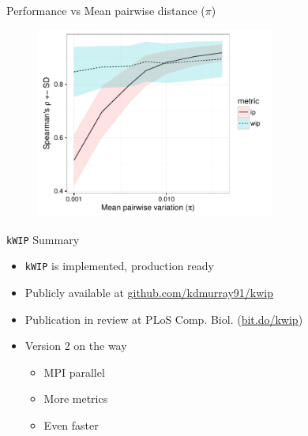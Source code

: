 \documentclass[t]{beamer}
\begin{document}
\begin{frame}{Performance vs Mean pairwise distance ($\pi$)}
  \begin{figure}
    \centering
    \includegraphics[width=0.7\textwidth]{img/pi-vs-performance.pdf}
  \end{figure}
\end{frame}

\begin{frame}{\texttt{kWIP} Summary}
  \begin{itemize}
    \item \texttt{kWIP} is implemented, production ready
    \item Publicly available at \url{github.com/kdmurray91/kwip}
    \item Publication in review at PLoS Comp. Biol. (\url{bit.do/kwip})
    \item Version 2 on the way
    \begin{itemize}
      \item MPI parallel
      \item More metrics
      \item Even faster
    \end{itemize}
  \end{itemize}
\end{frame}
\end{document}

